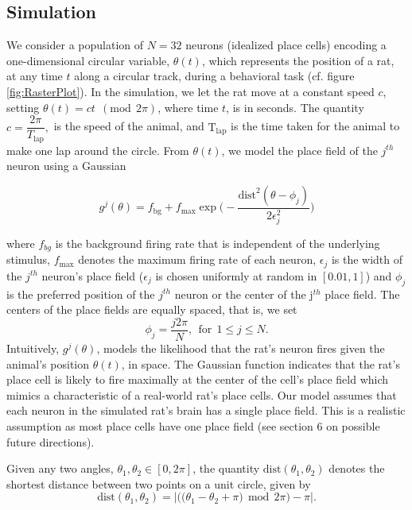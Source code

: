 \subsection{Simulation}
We consider a population of $N=32$  neurons (idealized place cells) encoding a 
one-dimensional circular  variable, $\theta(t)$, which represents 
the position of a rat, at any time $t$ along a circular track, during a behavioral task  (cf.  figure \ref{fig:RasterPlot}).
In the simulation, we let the rat move at a constant speed $c$, setting  $\theta(t) = c t \ \ (\text{mod} \ \ 2\pi)$, where time $t$, is in seconds. The quantity  $c = \dfrac{2\pi}{T_{\text{lap}}},$ is the speed of the animal, and
$\text{T}_{\text{lap}}$ is the time taken for the animal to make one lap around the circle.
From  $\theta(t)$,  we model the place field of the $j^{th}$ neuron using a Gaussian 

\begin{equation}
{g}^{j}(\theta) = \displaystyle  f_{\text{bg}} + f_{\max} 
\exp\bigg(-\dfrac{\text{dist}^{2}(\theta - \phi_{j})}{2\epsilon_{j}^{2}} \bigg)
\end{equation}

where $f_{bg}$ is the background firing rate that is independent of the underlying stimulus, $f_{\max}$ denotes the maximum firing rate of each neuron, $\epsilon_j $  is the width of the $j^{th}$ neuron's place field ($\epsilon_j$ is chosen uniformly at random in  $[0.01, 1]$)  and $\phi_{j}$ is the preferred position of the $j^{th}$  neuron or the center of the j$^{th}$ place field. The centers of the place fields are equally spaced, that is, we set
$$\phi_j = \frac{j2\pi}{N}, \ \    \text{for}   \ \    1 \leq j \leq N.$$
Intuitively, $g^{j}(\theta)$, models  the likelihood that the rat's neuron fires given the animal's position $\theta(t)$, in space.
The Gaussian function indicates that the rat's place cell is  likely to fire maximally  at the center of the cell's place field
which mimics a characteristic  of a real-world rat's place cells.
Our model assumes that each neuron in the simulated rat's brain has a single place field. This is a realistic assumption as 
most place cells have one place field (see section 6 on possible future directions). 


Given any two angles, $\theta_{1}, \theta_{2} \in [0, 2\pi]$, the quantity
$\text{dist}(\theta_{1}, \theta_{2})$ denotes the shortest distance between 
two points on a unit circle, given by
\[
\text{dist}(\theta_{1}, \theta_{2}) =  \left | \big( \big( \theta_{1} - \theta_{2} + \pi  \big) \ \ \text{mod} \ \ 2\pi \big) - \pi \right|.
\]

